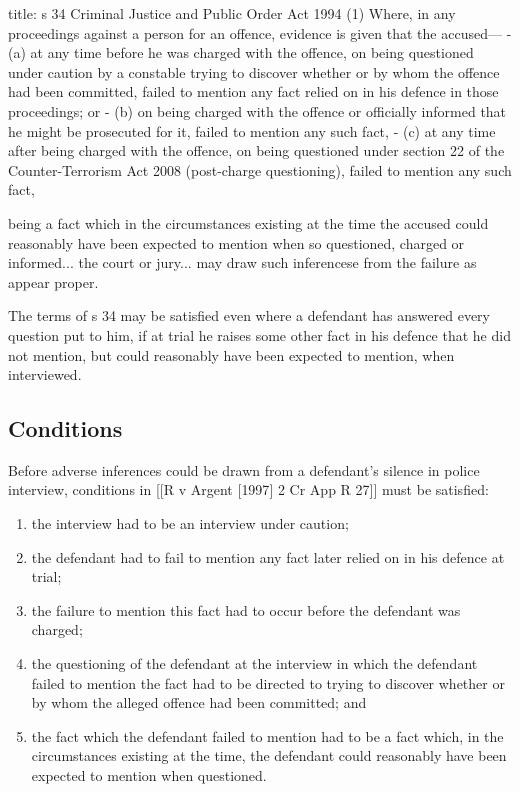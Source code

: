 \documentclass[
]{article}
\newenvironment{Shaded}{}{}
\newcommand{\NormalTok}[1]{#1}
\providecommand{\tightlist}{%
  \setlength{\itemsep}{0pt}\setlength{\parskip}{0pt}}
\begin{document}
\begin{Shaded}
\begin{Highlighting}[]
\NormalTok{title: s 34 Criminal Justice and Public Order Act 1994}
\NormalTok{(1) Where, in any proceedings against a person for an offence, evidence is given that the accused—}
\NormalTok{{-} (a) at any time before he was charged with the offence, on being questioned under caution by a constable trying to discover whether or by whom the offence had been committed, failed to mention any fact relied on in his defence in those proceedings; or}
\NormalTok{{-} (b) on being charged with the offence or officially informed that he might be prosecuted for it, failed to mention any such fact,}
\NormalTok{{-} (c) at any time after being charged with the offence, on being questioned under section 22 of the Counter{-}Terrorism Act 2008 (post{-}charge questioning), failed to mention any such fact,}

\NormalTok{being a fact which in the circumstances existing at the time the accused could reasonably have been expected to mention when so questioned, charged or informed... the court or jury... may draw such inferencese from the failure as appear proper. }
\end{Highlighting}
\end{Shaded}

The terms of s 34 may be satisfied even where a defendant has answered
every question put to him, if at trial he raises some other fact in his
defence that he did not mention, but could reasonably have been expected
to mention, when interviewed.

\hypertarget{conditions}{%
\subsection{Conditions}\label{conditions}}

Before adverse inferences could be drawn from a defendant's silence in
police interview, conditions in {[}{[}R v Argent {[}1997{]} 2 Cr App R
27{]}{]} must be satisfied:

\begin{enumerate}
\def\labelenumi{\arabic{enumi}.}
\tightlist
\item
  the interview had to be an interview under caution;
\item
  the defendant had to fail to mention any fact later relied on in his
  defence at trial;
\item
  the failure to mention this fact had to occur before the defendant was
  charged;
\item
  the questioning of the defendant at the interview in which the
  defendant failed to mention the fact had to be directed to trying to
  discover whether or by whom the alleged offence had been committed;
  and
\item
  the fact which the defendant failed to mention had to be a fact which,
  in the circumstances existing at the time, the defendant could
  reasonably have been expected to mention when questioned.
\end{enumerate}
\end{document}
